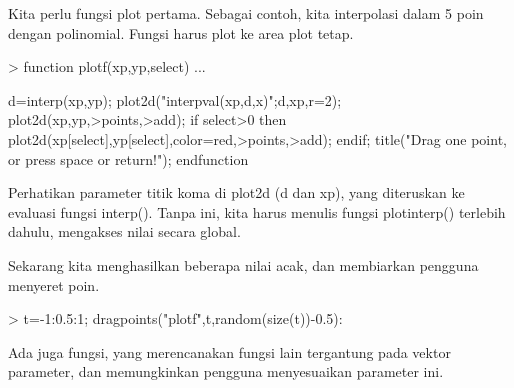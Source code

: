 \documentclass[a4paper,10pt]{article}
\begin{document}
\begin{eulernotebook}
\begin{eulercomment}
\begin{eulercomment}
\begin{eulercomment}
\begin{eulercomment}
\begin{eulercomment}
\begin{eulercomment}
\begin{eulercomment}
Kita perlu fungsi plot pertama. Sebagai contoh, kita interpolasi dalam
5 poin dengan polinomial. Fungsi harus plot ke area plot tetap.
\end{eulercomment}
\begin{eulerprompt}
> function plotf(xp,yp,select) ...
\end{eulerprompt}
\begin{eulerudf}
    d=interp(xp,yp);
    plot2d("interpval(xp,d,x)";d,xp,r=2);
    plot2d(xp,yp,>points,>add);
    if select>0 then
      plot2d(xp[select],yp[select],color=red,>points,>add);
    endif;
    title("Drag one point, or press space or return!");
  endfunction
\end{eulerudf}
\begin{eulercomment}
Perhatikan parameter titik koma di plot2d (d dan xp), yang diteruskan
ke evaluasi fungsi interp(). Tanpa ini, kita harus menulis fungsi
plotinterp() terlebih dahulu, mengakses nilai secara global.

Sekarang kita menghasilkan beberapa nilai acak, dan membiarkan
pengguna menyeret poin.
\end{eulercomment}
\begin{eulerprompt}
> t=-1:0.5:1; dragpoints("plotf",t,random(size(t))-0.5):
\end{eulerprompt}
\begin{eulercomment}
Ada juga fungsi, yang merencanakan fungsi lain tergantung pada vektor
parameter, dan memungkinkan pengguna menyesuaikan parameter ini.


\end{eulercomment}
\end{eulercomment}
\end{eulercomment}
\end{eulercomment}
\end{eulercomment}
\end{eulercomment}
\end{eulercomment}
\end{eulernotebook}
\end{document}
